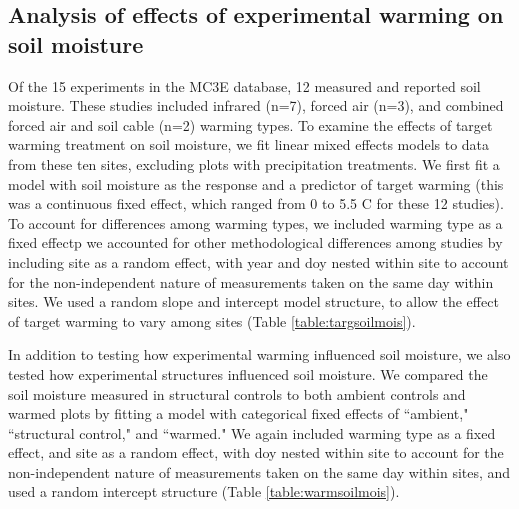 \documentclass{article}
\begin{document}
\subsection* {Analysis of effects of experimental warming on soil moisture}
Of the 15 experiments in the MC3E database, 12 measured and reported soil moisture. These studies included infrared (n=7), forced air (n=3), and combined forced air and soil cable (n=2) warming types. To examine the effects of target warming treatment on soil moisture, we fit linear mixed effects models to data from these ten sites, excluding plots with precipitation treatments. We first fit a model with soil moisture as the response and a predictor of target warming (this was a continuous fixed effect, which ranged from 0 to 5.5 \degree C for these 12 studies). To account for differences among warming types, we included warming type as a fixed effectp we accounted for other methodological differences among studies by including site as a random effect, with year and doy nested within site to account for the non-independent nature of measurements taken on the same day within sites.  We used a random slope and intercept model structure, to allow the effect of target warming to vary among sites (Table \ref{table:targsoilmois}). 

\par In addition to testing how experimental warming influenced soil moisture, we also tested how experimental structures influenced soil moisture. We compared the soil moisture measured in structural controls to both ambient controls and warmed plots by fitting a model with categorical fixed effects of ``ambient," ``structural control," and ``warmed."  We again included warming type as a fixed effect, and site as a random effect, with doy nested within site to account for the non-independent nature of measurements taken on the same day within sites, and used a random intercept structure (Table \ref{table:warmsoilmois}). 
\end{document}
